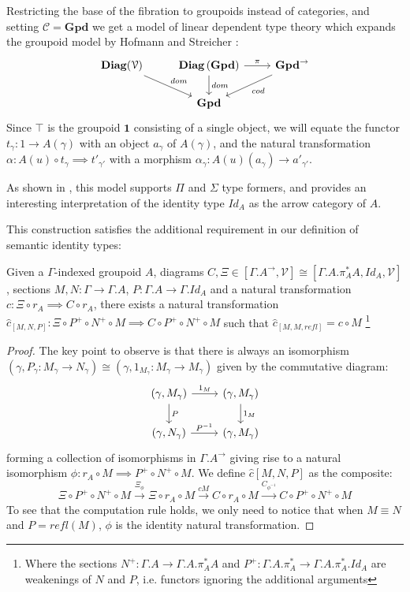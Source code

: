 \documentclass[a4paper,english]{lipics-v2018}
\DeclareMathOperator{\diag}{\mathbf{Diag}}
\begin{document}
Restricting the base of the fibration to groupoids instead of categories, and setting $\mathcal{C} = \mathbf{Gpd}$ we get a model of linear dependent type theory which expands the groupoid model by Hofmann and Streicher \cite{hofmann1998}:
\[
\begin{tikzcd}
\diag(\mathcal{V}) \ar[rd, "dom"]  & \diag{\mathbf{(Gpd)}} \ar[d, "dom"] \ar[r, "\pi"] & \mathbf{Gpd}^\to \ar[ld, "cod"] \\
& \mathbf{Gpd}
\end{tikzcd}
\]
Since $\top$ is the groupoid $\mathbf{1}$ consisting of a single object, we will equate the functor $t_\gamma : 1 \to A(\gamma)$ with an object $a_\gamma$ of $A(\gamma)$, and the natural transformation $\alpha : A(u) \circ t_\gamma \implies t'_{\gamma'}$ with a morphism $\alpha_\gamma : A(u)(a_\gamma) \to a'_{\gamma'}$.

As shown in \cite{hofmann1998}, this model supports $\Pi$ and $\Sigma$ type formers, and provides an interesting interpretation of the identity type $Id_A$ as the arrow category of $A$.

This construction satisfies the additional requirement in our definition of semantic identity types:
\begin{theorem}Given a $\Gamma$-indexed groupoid $A$, diagrams $C, \Xi \in [\Gamma.A^\to, \mathcal{V}] \cong [\Gamma.A.\pi_A^*A,Id_A, \mathcal{V}]$, sections $M, N : \Gamma \to \Gamma.A$, $P : \Gamma.A \to \Gamma.Id_A$ and a natural transformation $c : \Xi \circ r_A \implies C\circ r_A$, there exists a natural transformation $\hat c_{[M,N,P]} : \Xi \circ P^+ \circ N^+ \circ M \implies C \circ P^+ \circ N^+ \circ M$ such that $\hat c_{[M,M,refl]} = c \circ M$ \footnote{Where the sections $N^+ : \Gamma.A \to \Gamma.A.\pi_A^*A$ and $P^+ : \Gamma.A.\pi_A^* \to \Gamma.A.\pi_A^*.Id_A$ are weakenings of $N$ and $P$, i.e. functors ignoring the additional arguments}
  \begin{proof}
    The key point to observe is that there is always an isomorphism $(\gamma, P_\gamma : M_\gamma \to N_\gamma) \cong (\gamma, 1_{M_\gamma} : M_\gamma \to M_\gamma)$ given by the commutative diagram:
    \[
      \begin{tikzcd}
      (\gamma, M_\gamma) \ar[d, "P"] \ar[r, "1_M"] & (\gamma, M_\gamma) \ar[d, "1_M"]\\
      (\gamma, N_\gamma) \ar[r, "P^{-1}"] & (\gamma, M_\gamma)
      \end{tikzcd}
    \]
    forming a collection of isomorphisms in $\Gamma.A^\to$ giving rise to a natural isomorphism $\phi : r_A \circ M \implies P^+ \circ N^+ \circ M$. We define $\hat c[M,N,P]$ as the composite:
\[
\Xi \circ P^+ \circ N^+ \circ M \xrightarrow{\Xi_{\phi}} \Xi \circ r_A \circ M \xrightarrow{cM} C \circ r_A \circ M \xrightarrow{C_{\phi^{-1}}} C \circ P^+ \circ N^+ \circ M
\]
To see that the computation rule holds, we only need to notice that when $M \equiv N$ and $P = refl(M)$, $\phi$ is the identity natural transformation.
\end{proof}
\end{theorem}
\end{document}
